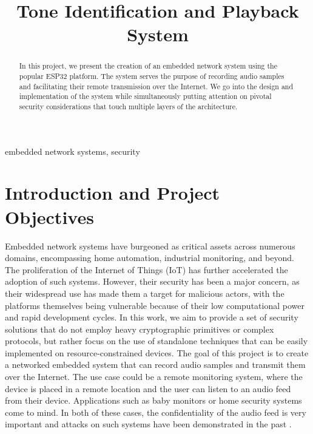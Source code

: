 \documentclass[conference]{IEEEtran}
\begin{document}
\title{Tone Identification and Playback System}

\author{
\and
{}
}

\maketitle

\begin{abstract}
    In this project, we present the creation of an
    embedded network system using the popular ESP32 platform. The system serves
    the purpose of recording audio samples and facilitating their remote
    transmission over the Internet. We go into the design and implementation
    of the system while simultaneously putting attention
    on pivotal security considerations that touch multiple
    layers of the architecture. 
\end{abstract}

\begin{IEEEkeywords}
embedded network systems, security
\end{IEEEkeywords}

\section{Introduction and Project Objectives}

Embedded network systems have burgeoned as critical assets across numerous
domains, encompassing home automation, industrial monitoring, and beyond. 
The proliferation of the Internet of Things (IoT) has further accelerated the
adoption of such systems\cite{IotTechEmbedded}.
However, their security has been a major concern,\cite{EmbeddedSecSurveyEU}
as their widespread use has made them a target for malicious actors, 
with the platforms themselves being vulnerable because of their low computational power and
rapid development cycles\cite{EmbeddedSecChallenges}.
In this work, we aim to provide a set of security solutions that do not employ 
heavy cryptographic primitives or complex protocols, but rather
focus on the use of standalone techniques that can be easily implemented
on resource-constrained devices.
The goal of this project is to create a networked embedded system that can record audio samples and transmit them over the Internet.
The use case could be a remote monitoring system, where the device is placed in a remote location and 
the user can listen to an audio feed from their device. Applications such as baby monitors or home security systems come to mind.
In both of these cases, the confidentiality of the audio feed is very important and
attacks on such systems have been demonstrated in the past \cite{BabyMonitorHack, VideoSurvAttacks}.
\end{document}
